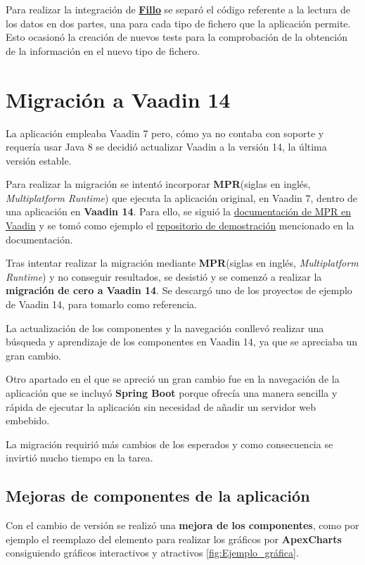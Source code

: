 Para realizar la integración de \textbf{\href{https://codoid.com/fillo/}{Fillo}} se separó el código referente a la lectura de los datos en dos partes, una para cada tipo de fichero que la aplicación permite. Esto ocasionó la creación de nuevos tests para la comprobación de la obtención de la información en el nuevo tipo de fichero.

\section{Migración a Vaadin 14}
La aplicación empleaba Vaadin 7 pero, cómo ya no contaba con soporte y requería usar Java 8 se decidió actualizar Vaadin a la versión 14, la última versión estable.  

Para realizar la migración se intentó incorporar \textbf{MPR}(siglas en inglés, \emph{Multiplatform Runtime}) que ejecuta la aplicación original, en Vaadin 7, dentro de una aplicación en \textbf{Vaadin 14}. Para ello, se siguió la \href{https://vaadin.com/docs/v14/tools/mpr/introduction/step-1-maven-v7}{documentación de MPR en Vaadin} y se tomó como ejemplo el \href{https://github.com/OlliTietavainenVaadin/mpr-demo/tree/v7}{repositorio de demostración} mencionado en la documentación.

Tras intentar realizar la migración mediante \textbf{MPR}(siglas en inglés, \emph{Multiplatform Runtime}) y no conseguir resultados, se desistió y se comenzó a realizar la \textbf{migración de cero a Vaadin 14}. Se descargó uno de los proyectos de ejemplo de Vaadin 14, para tomarlo como referencia. 

La actualización de los componentes y la navegación conllevó realizar una búsqueda y aprendizaje de los componentes en Vaadin 14, ya que se apreciaba un gran cambio.

Otro apartado en el que se apreció un gran cambio fue en la navegación de la aplicación que se incluyó \textbf{Spring Boot} porque ofrecía una manera sencilla y rápida de ejecutar la aplicación sin necesidad de añadir un servidor web embebido.

La migración requirió más cambios de los esperados y como consecuencia se invirtió mucho tiempo en la tarea.

\subsection{Mejoras de componentes de la aplicación}
Con el cambio de versión se realizó una \textbf{mejora de los componentes}, como por ejemplo el reemplazo del elemento para realizar los gráficos por \textbf{ApexCharts} consiguiendo gráficos interactivos y atractivos \ref{fig:Ejemplo_gráfica}.

